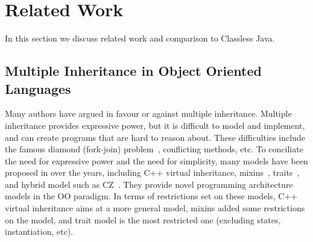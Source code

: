 \section{Related Work}\label{sec:related}
In this section we discuss related work and comparison to Classless Java.



\subsection{Multiple Inheritance in Object Oriented Languages}
Many authors have argued in favour or against multiple inheritance.  Multiple inheritance provides
expressive power, but it is difficult to model and implement, and can create
programs that are hard to reason about. These difficulties include the famous
diamond (fork-join) problem~\cite{bracha90mixin,Sak89dis}, conflicting methods, etc.
To conciliate the need for expressive power and the need for simplicity, many
models have been proposed in over the years, including C++ virtual
inheritance, mixins~\cite{bracha90mixin}, traits~\cite{scharli03traits}, and
hybrid model such as CZ~\cite{malayeri2009cz}.
They provide novel programming architecture models in the OO paradigm. In terms
of restrictions set on these models, C++ virtual inheritance aims at a more
general model, mixins added some restrictions on the model, and trait model is
the most restricted one (excluding states, instantiation, etc).

